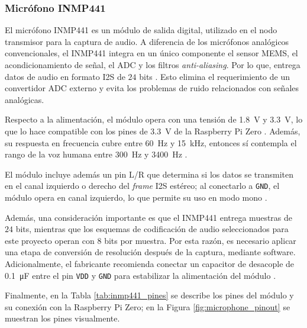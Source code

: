 \subsubsection{Micrófono INMP441}

El micrófono INMP441 es un módulo de salida digital, utilizado en el nodo transmisor para la captura de audio.
A diferencia de los micrófonos analógicos convencionales, el INMP441 integra en un único componente el sensor MEMS, el acondicionamiento de señal, el ADC y los filtros \textit{anti-aliasing}.
Por lo que, entrega datos de audio en formato I2S de $24$ bits \cite{inmp441_datasheet}.
Esto elimina el requerimiento de un convertidor ADC externo y evita los problemas de ruido relacionados con señales analógicas.

Respecto a la alimentación, el módulo opera con una tensión de \SI{1.8}{\volt} y \SI{3.3}{\volt}, lo que lo hace compatible con los pines de \SI{3.3}{\volt} de la Raspberry Pi Zero \cite{inmp441_datasheet}.
Además, su respuesta en frecuencia cubre entre \SI{60}{\hertz} y \SI{15}{\kilo\hertz}, entonces sí contempla el rango de la voz humana entre \SI{300}{\hertz} y \SI{3400}{\hertz} \cite{inmp441_datasheet, tanenbaum2011}.

El módulo incluye además un pin L/R que determina si los datos se transmiten en el canal izquierdo o derecho del \textit{frame} I2S estéreo; al conectarlo a \texttt{GND}, el módulo opera en canal izquierdo, lo que permite su uso en modo mono \cite{inmp441_datasheet}.

Además, una consideración importante es que el INMP441 entrega muestras de $24$ bits, mientras que los esquemas de codificación de audio seleccionados para este proyecto operan con $8$ bits por muestra.
Por esta razón, es necesario aplicar una etapa de conversión de resolución después de la captura, mediante software.
Adicionalmente, el fabricante recomienda conectar un capacitor de desacople de \SI{0.1}{\micro\farad} entre el pin \texttt{VDD} y \texttt{GND} para estabilizar la alimentación del módulo \cite{inmp441_datasheet}.

Finalmente, en la Tabla \ref{tab:inmp441_pines} se describe los pines del módulo y su conexión con la Raspberry Pi Zero; en la Figura \ref{fig:microphone_pinout} se muestran los pines visualmente.


